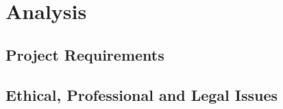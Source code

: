 \chapter{Analysis}\label{ch:analysis}

\section{Project Requirements}\label{sec:requirements}

\section{Ethical, Professional and Legal Issues}\label{sec:ethics-etc}

